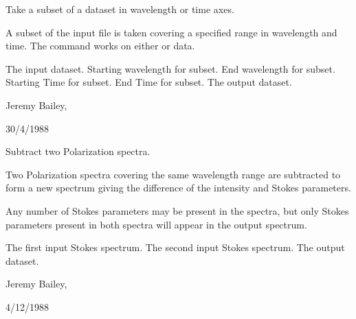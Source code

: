 \begin{manroutinedescription}
        Take a subset of a dataset in wavelength or time axes.

        A subset of the input file is taken covering a specified
        range in wavelength and time. The command works on
        either {} or {} data.

\begin{manparametertable}
  The input dataset.
     Starting wavelength for %
subset.
     End wavelength for subset.
   Starting Time for subset.
   End Time for subset.
  The output dataset.

\end{manparametertable}
         Jeremy Bailey, {}

         30/4/1988

\end{manroutinedescription}
\begin{manroutinedescription}
        Subtract two Polarization spectra.

        Two Polarization spectra covering the same wavelength range
        are subtracted to form a new spectrum giving the difference of
        the intensity and Stokes parameters.

        Any number of Stokes parameters may be present in the
        spectra, but only Stokes parameters present in both spectra
        will appear in the output spectrum.



\begin{manparametertable}
  The %
first input Stokes spectrum.
  The %
second input Stokes spectrum.
  The %
output dataset.

\end{manparametertable}
         Jeremy Bailey, {}

         4/12/1988

\end{manroutinedescription}
